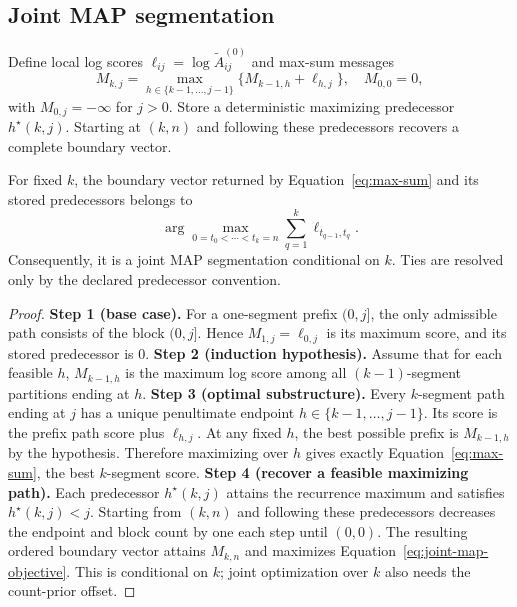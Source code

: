 \subsection{Joint MAP segmentation}
Define local log scores $\ell_{ij}=\log\widetilde A^{(0)}_{ij}$ and max-sum messages
\begin{equation}
M_{k,j}=\max_{h\in\{k-1,\ldots,j-1\}}
       \{M_{k-1,h}+\ell_{h,j}\},
\quad M_{0,0}=0,
\label{eq:max-sum}
\end{equation}
with $M_{0,j}=-\infty$ for $j>0$. Store a deterministic maximizing predecessor $h^\star(k,j)$. Starting at $(k,n)$ and following these predecessors recovers a complete boundary vector.

\begin{theorem}
\label{thm:map-correctness-paper}
For fixed $k$, the boundary vector returned by Equation~\eqref{eq:max-sum} and its stored predecessors belongs to
\begin{equation}
\arg\max_{0=t_0<\cdots<t_k=n}
  \sum_{q=1}^{k}\ell_{t_{q-1},t_q}.
\label{eq:joint-map-objective}
\end{equation}
Consequently, it is a joint MAP segmentation conditional on $k$. Ties are resolved only by the declared predecessor convention.
\end{theorem}
\begin{proof}
\textbf{Step 1 (base case).}
For a one-segment prefix $(0,j]$, the only admissible path consists of the block $(0,j]$. Hence $M_{1,j}=\ell_{0,j}$ is its maximum score, and its stored predecessor is $0$.
\textbf{Step 2 (induction hypothesis).}
Assume that for each feasible $h$, $M_{k-1,h}$ is the maximum log score among all $(k-1)$-segment partitions ending at $h$.
\textbf{Step 3 (optimal substructure).}
Every $k$-segment path ending at $j$ has a unique penultimate endpoint $h\in\{k-1,\ldots,j-1\}$. Its score is the prefix path score plus $\ell_{h,j}$. At any fixed $h$, the best possible prefix is $M_{k-1,h}$ by the hypothesis. Therefore maximizing over $h$ gives exactly Equation~\eqref{eq:max-sum}, the best $k$-segment score.
\textbf{Step 4 (recover a feasible maximizing path).}
Each predecessor $h^\star(k,j)$ attains the recurrence maximum and satisfies $h^\star(k,j)<j$. Starting from $(k,n)$ and following these predecessors decreases the endpoint and block count by one each step until $(0,0)$. The resulting ordered boundary vector attains $M_{k,n}$ and maximizes Equation~\eqref{eq:joint-map-objective}. This is conditional on $k$; joint optimization over $k$ also needs the count-prior offset.
\end{proof}

